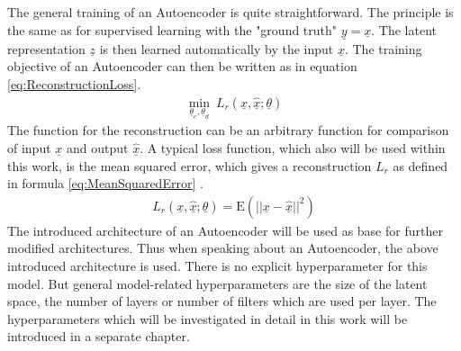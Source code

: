 \documentclass[12pt,DIV14,BCOR12mm,a4paper,footexclude,headinclude,halfparskip-,twoside,openright,cleardoubleempty,idxtotoc,bibtotoc,listtotoc]{scrreprt} %
\numberwithin{equation}{chapter}
\begin{document}
The general training of an Autoencoder is quite straightforward. The principle is the same as for supervised learning with the "ground truth" $\underline{y} = \underline{x}$. The latent representation $\underline{z}$ is then learned automatically by the input $\underline{x}$. The training objective of an Autoencoder can then be written as in equation \ref{eq:ReconstructionLoss}.
\begin{align}
	 \underset{\underline{\theta}_e,\underline{\theta}_d}\min\ L_r(\underline{x},\hat{\underline{x}};\underline{\theta})\label{eq:ReconstructionLoss}
\end{align}
The function for the reconstruction can be an arbitrary function for comparison of input $\underline{x}$ and output $\hat{\underline{x}}$. A typical loss function, which also will be used within this work, is the mean squared error, which gives a reconstruction $L_r$ as defined in formula \ref{eq:MeanSquaredError} \cite{LectureNotes_DeepLearning}.
\begin{align}
	 L_r(\underline{x},\hat{\underline{x}};\underline{\theta}) = \textrm{E}(||\underline{x}-\hat{\underline{x}}||^{2})\label{eq:MeanSquaredError}
\end{align}
The introduced architecture of an Autoencoder will be used as base for further modified architectures. Thus when speaking about an Autoencoder, the above introduced architecture is used. There is no explicit hyperparameter for this model. But general model-related hyperparameters are the size of the latent space, the number of layers or number of filters which are used per layer. The hyperparameters which will be investigated in detail in this work will be introduced in a separate chapter.
\end{document}
